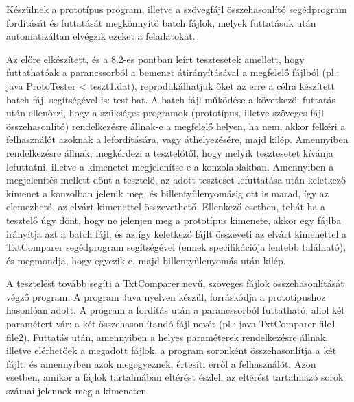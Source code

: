 Készülnek a prototípus program, illetve a szövegfájl összehasonlító segédprogram fordítását és futtatását megkönnyítő batch fájlok, melyek futtatásuk után automatizáltan elvégzik ezeket a feladatokat.

Az előre elkészített, és a 8.2-es pontban leírt tesztesetek amellett, hogy futtathatóak a parancssorból a bemenet átirányításával a megfelelő fájlból (pl.: java ProtoTester < teszt1.dat), reprodukálhatjuk őket az erre a célra készített batch fájl segítségével is: test.bat.
A batch fájl működése a következő: futtatás után ellenőrzi, hogy a szükséges programok (prototípus, illetve szöveges fájl összehasonlító) rendelkezésre állnak-e a megfelelő helyen, ha nem, akkor felkéri a felhasználót azoknak a lefordítására, vagy áthelyezésére, majd kilép. Amennyiben rendelkezésre állnak, megkérdezi a tesztelőtől, hogy melyik tesztesetet kívánja lefuttatni, illetve a kimenetet megjelenítse-e a konzolablakban. Amennyiben a megjelenítés mellett dönt a tesztelő, az adott teszteset lefuttatása után keletkező kimenet a konzolban jelenik meg, és billentyűlenyomásig ott is marad, így az elemezhető, az elvárt kimenettel összevethető. Ellenkező esetben, tehát ha a tesztelő úgy dönt, hogy ne jelenjen meg a prototípus kimenete, akkor egy fájlba irányítja azt a batch fájl, és az így keletkező fájlt összeveti az elvárt kimenettel a TxtComparer segédprogram segítségével (ennek specifikációja lentebb található), és megmondja, hogy egyezik-e, majd billentyűlenyomás után kilép.

A tesztelést tovább segíti a TxtComparer nevű, szöveges fájlok összehasonlítását végző program. A program Java nyelven készül, forráskódja a prototípushoz hasonlóan adott. A program a fordítás után a parancssorból futtatható, ahol két paramétert vár: a két összehasonlítandó fájl nevét (pl.: java TxtComparer file1 file2). 
Futtatás után, amennyiben a helyes paraméterek rendelkezésre állnak, illetve elérhetőek a megadott fájlok, a program soronként összehasonlítja a két fájlt, és amennyiben azok megegyeznek, értesíti erről a felhasználót. Azon esetben, amikor a fájlok tartalmában eltérést észlel, az eltérést tartalmazó sorok számai jelennek meg a kimeneten.
